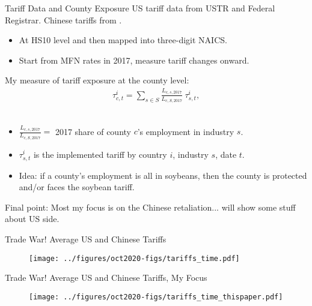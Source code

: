 \documentclass[9pt,pdftex,aspectratio=1610]{beamer}
\theoremstyle{definition}
\begin{document}
\begin{frame}[t]{Tariff Data and County Exposure}
US tariff data from USTR and Federal Registrar. Chinese tariffs from \citet*{bown_jung_2019}.
\begin{itemize}
\smallskip
\item At HS10 level and then mapped into three-digit NAICS.
\smallskip
\item Start from MFN rates in 2017, measure tariff changes onward.
\end{itemize}
\bigskip
My measure of tariff exposure at the county level:
\begin{eqnarray*}
\tau_{c,t}^{i} = \sum_{s\in S}\frac{L_{c,s,2017}}{L_{c, S, 2017}} \  \tau_{s,t}^{i} ,
\end{eqnarray*}\\
\begin{itemize}
\smallskip
\item $\frac{L_{c,s,2017}}{L_{c, S, 2017}}  = $ 2017 share of county $c$'s employment in industry $s$.
\smallskip
\item $\tau_{s,t}^{i}$ is the implemented tariff by country $i$, industry $s$, date $t$.
\smallskip
\item Idea: if a county's employment is all in soybeans, then the county is protected and/or faces the soybean tariff.
\end{itemize}
\medskip
Final point: Most my focus is on the Chinese retaliation... will show some stuff about US side.
\end{frame}


\begin{frame}[t]{Trade War! Average US and Chinese Tariffs}
\begin{figure}[t]
\centerline{\texttt{[image: ../figures/oct2020-figs/tariffs\_time.pdf]}}
\end{figure}
\end{frame}


\begin{frame}[t]{Trade War! Average US and Chinese Tariffs, My Focus}
\begin{figure}[t]
\centerline{\texttt{[image: ../figures/oct2020-figs/tariffs\_time\_thispaper.pdf]}}
\end{figure}
\end{frame}
\end{document}
